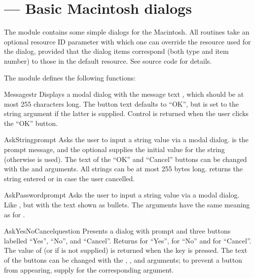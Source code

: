 \section{ ---
         Basic Macintosh dialogs}


The  module contains some simple dialogs for the
Macintosh. All routines take an optional resource ID parameter 
with which one can override the  resource used for the
dialog, provided that the dialog items correspond (both type and item
number) to those in the default  resource. See source
code for details.

The  module defines the following functions:


\begin{funcdesc}{Message}{str}
Displays a modal dialog with the message text , which should be
at most 255 characters long. The button text defaults to ``OK'', but is
set to the string argument  if the latter is supplied. Control
is returned when the user clicks the ``OK'' button.
\end{funcdesc}


\begin{funcdesc}{AskString}{prompt}
Asks the user to input a string value via a modal dialog. 
is the prompt message, and the optional  supplies the
initial value for the string (otherwise  is used). The text of
the ``OK'' and ``Cancel'' buttons can be changed with the  and
 arguments. All strings can be at most 255 bytes long.
 returns the string entered or  in case
the user cancelled.
\end{funcdesc}


\begin{funcdesc}{AskPassword}{prompt}
Asks the user to input a string value via a modal dialog. Like
, but with the text shown as bullets. The
arguments have the same meaning as for .
\end{funcdesc}


\begin{funcdesc}{AskYesNoCancel}{question}
Presents a dialog with prompt  and three buttons labelled
``Yes'', ``No'', and ``Cancel''. Returns  for ``Yes'', 
for ``No'' and  for ``Cancel''. The value of  (or
 if  is not supplied) is returned when the
 key is pressed. The text of the buttons can be changed with
the , , and  arguments; to prevent a button
from appearing, supply  for the corresponding argument.
\end{funcdesc}


